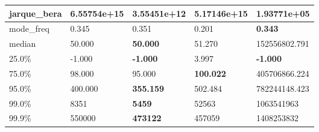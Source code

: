 \begin{table}[H]
\begin{tabular}{|l|m{10em}|m{10em}|m{10em}|m{10em}|}
\hline jarque\_bera & 6.55754e+15 & 3.55451e+12 & \bfseries 5.17146e+15 & \cellcolor[rgb]{0.9, 0.54, 0.52} 1.93771e+05 \\
\hline mode\_freq & 0.345 & 0.351 & \cellcolor[rgb]{0.9, 0.54, 0.52} 0.201 & \bfseries 0.343 \\
\hline median & 50.000 & \bfseries 50.000 & 51.270 & \cellcolor[rgb]{0.9, 0.54, 0.52} 152556802.791 \\
\hline 25.0\% & -1.000 & \bfseries -1.000 & \cellcolor[rgb]{0.9, 0.54, 0.52} 3.997 & \bfseries -1.000 \\
\hline 75.0\% & 98.000 & 95.000 & \bfseries 100.022 & \cellcolor[rgb]{0.9, 0.54, 0.52} 405706866.224 \\
\hline 95.0\% & 400.000 & \bfseries 355.159 & 502.484 & \cellcolor[rgb]{0.9, 0.54, 0.52} 782244148.423 \\
\hline 99.0\% & 8351 & \bfseries 5459 & 52563 & \cellcolor[rgb]{0.9, 0.54, 0.52} 1063541963 \\
\hline 99.9\% & 550000 & \bfseries 473122 & 457059 & \cellcolor[rgb]{0.9, 0.54, 0.52} 1408253832 \\
\hline
\end{tabular}
\end{table}
